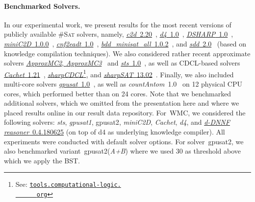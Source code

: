 \documentclass{llncs}
\newcommand{\cSAT}{\textsc{\#Sat}\xspace}%
\newcommand{\WMC}{\textsc{WMC}\xspace}%
\newcommand{\gpusatnu}{{\small\textsf{gpusat2}}\xspace}
\newcommand{\gpusatnuv}[1]{{\small\textsf{gpusat2({\textit{#1}})}}\xspace}
\newcommand{\gpusatone}{{\small\textsf{gpusat1}}\xspace}
\begin{document}
\paragraph{Benchmarked Solvers.}
In our experimental work, we present results for the most recent
versions of publicly available \cSAT solvers, namely,
%
\href{http://reasoning.cs.ucla.edu/c2d/download.php}{\textit{c2d}~2.20}~\cite{Darwiche04a},
\href{http://www.cril.univ-artois.fr/KC/d4.html}{\textit{d4}~1.0}~\cite{LagniezMarquis17a},
\href{https://bitbucket.org/haz/dsharp}{\textit{DSHARP}~1.0}~\cite{MuiseEtAl12a},
\href{http://reasoning.cs.ucla.edu/minic2d/}{\textit{miniC2D}~1.0.0}~\cite{OztokDarwiche15a},
\href{http://www.cril.univ-artois.fr/KC/eadt.html}{\textit{cnf2eadt}~1.0}~\cite{KoricheLagniezMarquisThomas13a}, 
\href{http://www.sd.is.uec.ac.jp/toda/code/cnf2obdd.html}{\textit{bdd\_{}minisat\_\allowbreak{}all}~1.0.2}~\cite{TodaSoh15a},
and \href{http://reasoning.cs.ucla.edu/sdd/}{\textit{sdd}~2.0}~\cite{Darwiche11a} (based on %
knowledge compilation techniques).
%
%
%
%
%
%
%
We also considered rather recent approximate solvers
\href{https://bitbucket.org/kuldeepmeel/approxmc}{\textit{ApproxMC2}, \textit{ApproxMC3}}~\cite{ChakrabortyEtAl14a}
and
\href{http://cs.stanford.edu/~ermon/code/STS.zip}{\textit{sts}~1.0}~\cite{ErmonGomesSelman12a},
%
as well as %
CDCL-based solvers
%
\href{https://www.cs.rochester.edu/u/kautz/Cachet/cachet-wmc-1-21.zip}{\textit{Cachet}~1.21}~\cite{SangEtAl04},
\href{http://tools.computational-logic.org/content/sharpCDCL.php}{\textit{sharpCDCL}}\footnote{See:
  \href{http://tools.computational-logic.
    org/content/sharpCDCL.php}{\nolinkurl{tools.computational-logic.
      org}}}, %
and
\href{https://sites.google.com/site/marcthurley/sharpsat}{\textit{sharpSAT}~13.02}~\cite{Thurley06a}.
%
Finally, we also included multi-core solvers
\href{https://github.com/daajoe/GPUSAT/releases/tag/v0.815-pre}{\textit{gpusat}~1.0}~\cite{FichteEtAl18c}, as well as
\textit{countAntom}~1.0~\cite{BurchardSchubertBecker15a} on 12 physical CPU
cores, which performed better than on 24 cores.
%
%
%
%
%
%
%
%
Note that we benchmarked additional solvers, which we omitted from the
presentation here and where we placed results online in our result
data repository.
%
For~\WMC, we considered the following solvers: \textit{sts},
\textit{\gpusatone}, \gpusatnu, \textit{miniC2D}, \textit{Cachet},
\textit{d4}, and
\href{http://www.cril.univ-artois.fr/kc/ressources/query-dnnf-0.4.180625.zip}{\textit{d-DNNF
    reasoner}~0.4.180625} (on top of d4 as underlying knowledge
compiler). %
All experiments were conducted with default solver options.
%
%
For solver~\gpusatnu, we also benchmarked variant~\gpusatnuv{A+B}
where we used 30 as threshold above which we apply the BST.
%
%
%
%
%
%
%
\end{document}
